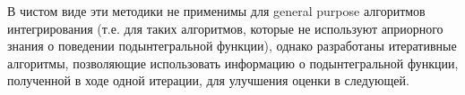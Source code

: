В чистом виде эти методики не применимы для general purpose алгоритмов интегрирования (т.е. для таких алгоритмов, которые не используют априорного знания о поведении подынтегральной функции), однако разработаны итеративные алгоритмы, позволяющие использовать информацию о подынтегральной функции, полученной в ходе одной итерации, для улучшения оценки в следующей. \cite{lepage1978, tsuda1973, haselgrove1961}
